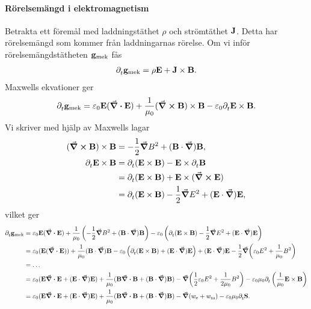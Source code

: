 \paragraph{Rörelsemängd i elektromagnetism}
Betrakta ett föremål med laddningstäthet $\rho$ och strömtäthet $\vb{J}$. Detta har rörelsemängd som kommer från laddningarnas rörelse. Om vi inför rörelsemängdstätheten $\vb{g}_{\text{mek}}$ fås
\begin{align*}
	\partial_{t}^{}\vb{g}_{\text{mek}} = \rho\vb{E} + \vb{J}\times\vb{B}.
\end{align*}
Maxwells ekvationer ger
\begin{align*}
	\partial_{t}^{}\vb{g}_{\text{mek}} = \varepsilon_{0}\vb{E}(\div{\vb{E}}) + \frac{1}{\mu_{0}}(\curl{\vb{B}})\times\vb{B} - \varepsilon_{0}\partial_{t}^{}\vb{E}\times\vb{B}.
\end{align*}
Vi skriver med hjälp av Maxwells lagar
\begin{align*}
	(\curl{\vb{B}})\times\vb{B} &= -\frac{1}{2}\grad{B^{2}} + (\vb{B}\cdot\grad)\vb{B}, \\
	\partial_{t}^{}\vb{E}\times\vb{B} &= \partial_{t}^{}(\vb{E}\times\vb{B}) - \vb{E}\times\partial_{t}^{}\vb{B} \\
	                            &= \partial_{t}^{}(\vb{E}\times\vb{B}) + \vb{E}\times(\curl{\vb{E}}) \\
	                            &= \partial_{t}^{}(\vb{E}\times\vb{B}) -\frac{1}{2}\grad{E^{2}} + (\vb{E}\cdot\grad)\vb{E},
\end{align*}
vilket ger
\begin{align*}
	\partial_{t}^{}\vb{g}_{\text{mek}} &= \varepsilon_{0}\vb{E}(\div{\vb{E}}) + \frac{1}{\mu_{0}}\left(-\frac{1}{2}\grad{B^{2}} + (\vb{B}\cdot\grad)\vb{B}\right) - \varepsilon_{0}\left(\partial_{t}^{}(\vb{E}\times\vb{B}) -\frac{1}{2}\grad{E^{2}} + (\vb{E}\cdot\grad)\vb{E}\right) \\
	                             &= \varepsilon_{0}(\vb{E}(\div{\vb{E}})) + \frac{1}{\mu_{0}}(\vb{B}\cdot\grad)\vb{B} - \varepsilon_{0}\left(\partial_{t}^{}(\vb{E}\times\vb{B}) + (\vb{E}\cdot\grad)\vb{E}\right) + (\vb{E}\cdot\grad)\vb{E} - \frac{1}{2}\grad(\varepsilon_{0}E^{2} + \frac{1}{\mu_{0}}B^{2}) \\
	                             &= \dots \\
	                             &= \varepsilon_{0}(\vb{E}\div{\vb{E}} + (\vb{E}\cdot\grad)\vb{E}) + \frac{1}{\mu_{0}}(\vb{B}\div{\vb{B}} + (\vb{B}\cdot\grad)\vb{B}) - \grad(\frac{1}{2}\varepsilon_{0}E^{2} + \frac{1}{2\mu_{0}}B^{2}) - \varepsilon_{0}\mu_{0}\partial_{t}^{}\left(\frac{1}{\mu_{0}}\vb{E}\times\vb{B}\right) \\
	                             &= \varepsilon_{0}(\vb{E}\div{\vb{E}} + (\vb{E}\cdot\grad)\vb{E}) + \frac{1}{\mu_{0}}(\vb{B}\div{\vb{B}} + (\vb{B}\cdot\grad)\vb{B}) - \grad(w_{\text{e}} + w_{\text{m}}) - \varepsilon_{0}\mu_{0}\partial_{t}^{}\vb{S}.
\end{align*}

